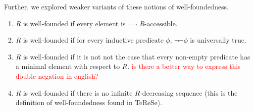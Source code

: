 \documentclass{scrartcl}
\begin{document}
  Further, we explored weaker variants of these notions of well-foundedness.
  \begin{dfn} \hfil
    \begin{enumerate}
      \item \textit{R} is well-founded if every element is $\lnot \lnot$  \textit{R}-accessible.
      \item \textit{R} is well-founded if for every inductive predicate $\phi$, $\lnot \lnot \phi$ is universally true.
      \item \textit{R} is well-founded if it is not not the case that every non-empty predicate has a minimal element with respect to $R$. \textcolor{red}{is there a better way to express this double negation in english?}
      \item \textit{R} is well-founded if there is no infinite $R$-decreasing sequence (this is the definition of well-foundedness found in TeReSe).
    \end{enumerate}
\end{dfn}
\end{document}
